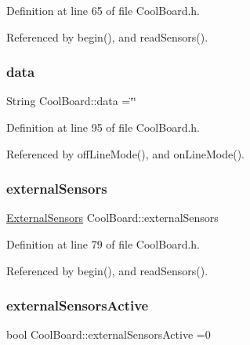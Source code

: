 Definition at line 65 of file Cool\+Board.\+h.



Referenced by begin(), and read\+Sensors().

\mbox{\label{classCoolBoard_a427fb753dd8575bdf821c70a5c63d695}} 
\subsubsection{\texorpdfstring{data}{data}}
{\footnotesize\ttfamily String Cool\+Board\+::data =\char`\"{}\char`\"{}\hspace{0.3cm}{\ttfamily [private]}}



Definition at line 95 of file Cool\+Board.\+h.



Referenced by off\+Line\+Mode(), and on\+Line\+Mode().

\mbox{\label{classCoolBoard_a09e26264839c65873eb56af476eff6b2}} 
\subsubsection{\texorpdfstring{external\+Sensors}{externalSensors}}
{\footnotesize\ttfamily \hyperlink{classExternalSensors}{External\+Sensors} Cool\+Board\+::external\+Sensors\hspace{0.3cm}{\ttfamily [private]}}



Definition at line 79 of file Cool\+Board.\+h.



Referenced by begin(), and read\+Sensors().

\mbox{\label{classCoolBoard_a638b00b76aeb819ecfd4c10b8cdd7bb7}} 
\subsubsection{\texorpdfstring{external\+Sensors\+Active}{externalSensorsActive}}
{\footnotesize\ttfamily bool Cool\+Board\+::external\+Sensors\+Active =0\hspace{0.3cm}{\ttfamily [private]}}



